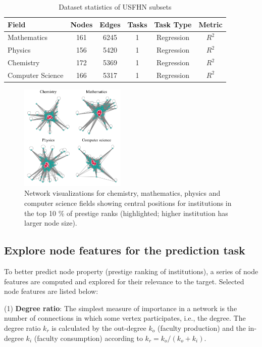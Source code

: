 \documentclass[journal]{IEEEtran}
\begin{document}
\begin{table}[htbp]
\caption{Dataset statistics of USFHN subsets}
\begin{center}
\begin{tabular}{l | ccccc}
\hline
\textbf{Field} & \textbf{Nodes} & \textbf{Edges} & \textbf{Tasks} & \textbf{Task Type} & \textbf{Metric} \\
\hline
Mathematics  &  161  &  6245  &  1  &   Regression   &  $R^2$  \\
Physics  &  156  &  5420  &  1  &  Regression  &  $R^2$  \\
Chemistry  & 172  & 5369  &  1 &  Regression &  $R^2$  \\
Computer Science  & 166  &  5317 &  1   & Regression  &  $R^2$ \\
\hline
\end{tabular}
\label{t1}
\end{center}
\end{table}

\begin{figure}[htbp]
\centerline{\includegraphics[width=0.45\textwidth]{figures/fig1.pdf}}
\caption{Network visualizations for chemistry, mathematics, physics and computer science fields showing central positions for institutions in the top 10 \% of prestige ranks (highlighted; higher institution has larger node size).}
\label{fig1}
\end{figure}


\subsection{Explore node features for the prediction task}
To better predict node property (prestige ranking of institutions), a series of node features are computed and explored for their relevance to the target. Selected node features are listed below:

(1) \textbf{Degree ratio}: The simplest measure of importance in a network is the number of connections in which some
vertex participates, i.e., the degree. The degree ratio $k_r$ is calculated by the out-degree $k_o$ (faculty production) and the in-degree $k_i$ (faculty consumption) according to $k_r = k_o / (k_o + k_i)$.
\end{document}
